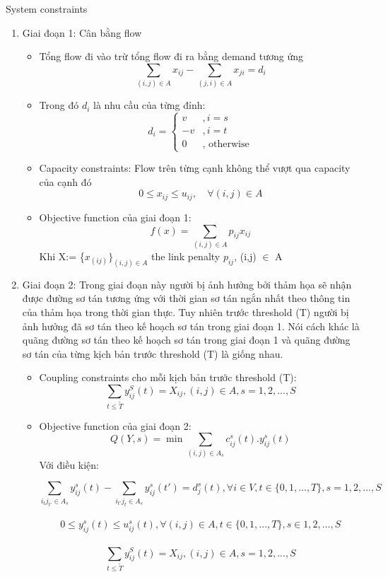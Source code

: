 \documentclass[a4paper]{article}
\begin{document}
{System constraints}
\begin{enumerate}
    \item[] {Giai đoạn 1: Cân bằng flow}
    \begin{itemize}
        \item Tổng flow đi vào trừ tổng flow đi ra bằng demand tương ứng
        \[\sum_{(i,j)\in A}x_{ij}-\sum_{(j,i)\in A}x_{ji}=d_{i}\]
        \item Trong đó $d_i$ là nhu cầu của từng đỉnh:
        \[d_i=\left\{\begin{aligned}
        v&, i = s\\
        -v&, i = t\\
        0&, \text{  otherwise}
        \end{aligned}\right.\]
        \item Capacity constraints: Flow trên từng cạnh không thể vượt qua capacity của cạnh đó
        \[0 \le x_{ij} \le u_{ij}, \quad \forall (i,j) \in A\]
        \item Objective function của giai đoạn 1:
        \[f(x) = \sum_{(i,j) \in A} p_{ij} x_{ij}\]
        {Khi X:= \{$x_{(ij)}\}_{(i,j)\in A}$} the link penalty $p_{ij}$, (i,j) $\in$ A
    \end{itemize}
    \item[] {Giai đoạn 2: Trong giai đoạn này người bị ảnh hưởng bởi thảm họa sẽ nhận được đường sơ tán tương ứng với thời gian sơ tán ngắn nhất theo thông tin của thảm họa trong thời gian thực. Tuy nhiên trước threshold (T) người bị ảnh hưởng đã sơ tán theo kế hoạch sơ tán trong giai đoạn 1. Nói cách khác là quãng đường sơ tán theo kế hoạch sơ tán trong giai đoạn 1 và quãng đường sơ tán của từng kịch bản trước threshold (T) là giống nhau.}  
    \begin{itemize}
        \item Coupling constraints cho mỗi kịch bản trước threshold (T):
        \[\sum_{t \leq \widetilde{T}} y_{ij}^S(t) = X_{ij}, (i,j) \in A, s = 1, 2,..., S\]
        \item Objective function của giai đoạn 2:
        \[Q(Y, s) = \min \sum_{(i, j) \in A_s} c_{ij}^s(t). y_{ij}^s(t)\]
        {Với điều kiện:}

    \[\sum_{i_tj_{t'} \in A_s}y_{ij}^s(t) - \sum_{i_{t'}j_{t} \in A_s}y_{ij}^s(t') = d_j^s(t), \forall i \in V, t\in \{0, 1,..., T\}, s = 1, 2,..., S\]\\
\[0 \le y_{ij}^s(t) \le u_{ij}^s(t),  \forall (i, j) \in A, t \in \{0, 1, \dots, T\}, s \in 1, 2, \dots, S\] \\
\[\sum_{t \leq \widetilde{T}} y_{ij}^S(t) = X_{ij}, (i,j) \in A, s = 1, 2,..., S\]
    \end{itemize}
\end{enumerate}
\end{document}
